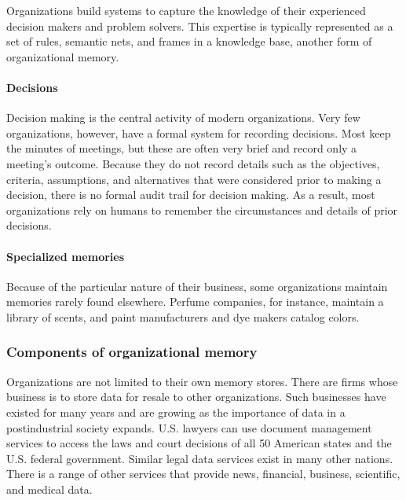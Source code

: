 \documentclass[
]{article}
\begin{document}
Organizations build systems to capture the knowledge of their
experienced decision makers and problem solvers. This expertise is
typically represented as a set of rules, semantic nets, and frames in a
knowledge base, another form of organizational memory.

\hypertarget{decisions}{%
\paragraph*{Decisions}\label{decisions}}

Decision making is the central activity of modern organizations. Very
few organizations, however, have a formal system for recording
decisions. Most keep the minutes of meetings, but these are often very
brief and record only a meeting's outcome. Because they do not record
details such as the objectives, criteria, assumptions, and alternatives
that were considered prior to making a decision, there is no formal
audit trail for decision making. As a result, most organizations rely on
humans to remember the circumstances and details of prior decisions.

\hypertarget{specialized-memories}{%
\paragraph*{Specialized memories}\label{specialized-memories}}

Because of the particular nature of their business, some organizations
maintain memories rarely found elsewhere. Perfume companies, for
instance, maintain a library of scents, and paint manufacturers and dye
makers catalog colors.

\hypertarget{components-of-organizational-memory-1}{%
\subsubsection*{Components of organizational memory}\label{components-of-organizational-memory-1}}

Organizations are not limited to their own memory stores. There are
firms whose business is to store data for resale to other organizations.
Such businesses have existed for many years and are growing as the
importance of data in a postindustrial society expands. U.S. lawyers can
use document management services to access the laws and court decisions
of all 50 American states and the U.S. federal government. Similar legal
data services exist in many other nations. There is a range of other
services that provide news, financial, business, scientific, and medical
data.
\end{document}
